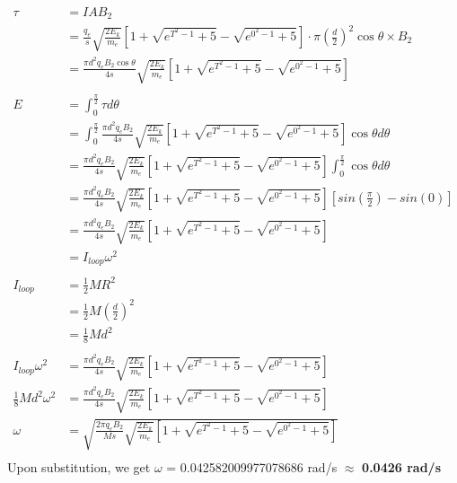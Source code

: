 \begin{align*}
\tau &= IAB_2 \\
&= \frac{q_e}{s}\sqrt{\frac{2E_k}{m_e}} [1 + \sqrt{e^{T^2-1}+5} - \sqrt{e^{0^2-1}+5}] \cdot \pi (\frac{d}{2})^2\cos{\theta} \times B_2 \\
&= \frac{\pi d^2q_eB_2\cos{\theta}}{4s}\sqrt{\frac{2E_k}{m_e}} [1 + \sqrt{e^{T^2-1}+5} - \sqrt{e^{0^2-1}+5}] \\
\\
E &= \int_0^\frac{\pi}{2}\tau d\theta \\
&= \int_0^\frac{\pi}{2} \frac{\pi d^2q_eB_2}{4s}\sqrt{\frac{2E_k}{m_e}} [1 + \sqrt{e^{T^2-1}+5} - \sqrt{e^{0^2-1}+5}]\cos{\theta}  d\theta \\
&= \frac{\pi d^2q_eB_2}{4s}\sqrt{\frac{2E_k}{m_e}} [1 + \sqrt{e^{T^2-1}+5} - \sqrt{e^{0^2-1}+5}] \int_0^\frac{\pi}{2}\cos{\theta}  d\theta \\
&= \frac{\pi d^2q_eB_2}{4s}\sqrt{\frac{2E_k}{m_e}} [1 + \sqrt{e^{T^2-1}+5} - \sqrt{e^{0^2-1}+5}][sin(\frac{\pi}{2}) - sin(0)] \\
&= \frac{\pi d^2q_eB_2}{4s}\sqrt{\frac{2E_k}{m_e}} [1 + \sqrt{e^{T^2-1}+5} - \sqrt{e^{0^2-1}+5}] \\
&= I_{loop}\omega^2
\\\\
I_{loop} &= \frac{1}{2}MR^2 \\
&= \frac{1}{2}M(\frac{d}{2})^2 \\
&= \frac{1}{8}Md^2
\\\\
I_{loop}\omega^2 &= \frac{\pi d^2q_eB_2}{4s}\sqrt{\frac{2E_k}{m_e}} [1 + \sqrt{e^{T^2-1}+5} - \sqrt{e^{0^2-1}+5}] \\
\frac{1}{8}Md^2\omega^2 &= \frac{\pi d^2q_eB_2}{4s}\sqrt{\frac{2E_k}{m_e}} [1 + \sqrt{e^{T^2-1}+5} - \sqrt{e^{0^2-1}+5}] \\
\omega &= \sqrt{\frac{2\pi q_eB_2}{Ms}\sqrt{\frac{2E_k}{m_e}} [1 + \sqrt{e^{T^2-1}+5} - \sqrt{e^{0^2-1}+5}]} \\
\end{align*}
Upon substitution, we get $\omega$ = 0.042582009977078686 rad/s $\approx$ \textbf{0.0426 rad/s}



